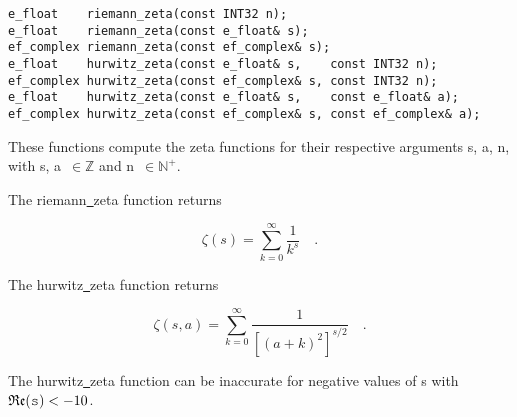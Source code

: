 \begin{lstlisting}
e_float    riemann_zeta(const INT32 n);
e_float    riemann_zeta(const e_float& s);
ef_complex riemann_zeta(const ef_complex& s);
e_float    hurwitz_zeta(const e_float& s,    const INT32 n);
ef_complex hurwitz_zeta(const ef_complex& s, const INT32 n);
e_float    hurwitz_zeta(const e_float& s,    const e_float& a);
ef_complex hurwitz_zeta(const ef_complex& s, const ef_complex& a);
\end{lstlisting}

 These functions compute the zeta functions
for their respective arguments
{\courier s}, {\courier a}, {\courier n},
with {\courier s}, {\courier a}~$\in\mathbb{Z}$ and {\courier n}~$\in\mathbb{N}^{+}$.

\vspace{6.0pt}

 The {\courier riemann\underline\ zeta} function
returns~\cite{wolframfunctions:website}

\begin{equation}
\zeta(s) = \sum_{k=0}^{\infty} \frac{1}{k^{s}}\quad .
\end{equation}

\vspace{6.0pt}

 The {\courier hurwitz\underline\ zeta} function
returns~\cite{wolframfunctions:website}

\begin{equation}
\zeta(s,a) =
\sum_{k=0}^{\infty} \frac{1}{\left[\left(a + k\right)^{2}\right]^{s/2}}\quad .
\end{equation}

\vspace{6.0pt}

 The {\courier hurwitz\underline\ zeta} function
can be inaccurate for negative values of {\courier s} with $\Re(\text{{\courier s}}) < -10$.

